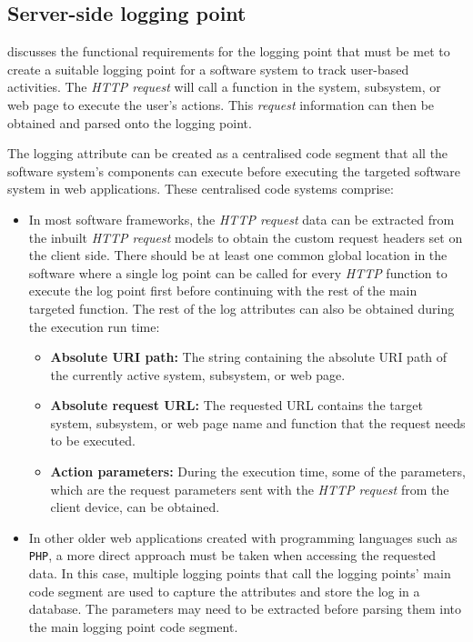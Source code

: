 \clearpage

\subsection{Server-side logging point}\label{sec:ch2_serverSideLoggingpoint}
 discusses the functional requirements for the logging point that must be met to create a suitable logging point for a software system to track user-based activities. The \textit{HTTP request} will call a function in the system, subsystem, or web page to execute the user's actions. This \textit{request} information can then be obtained and parsed onto the logging point. \par The logging attribute can be created as a centralised code segment that all the software system's components can execute before executing the targeted software system in web applications. These centralised code systems comprise:

\begin{itemize}
	\item In most software frameworks, the \textit{HTTP request} data can be extracted from the inbuilt \textit{HTTP request} models to obtain the custom request headers set on the client side. There should be at least one common global location in the software where a single log point can be called for every \textit{HTTP} function to execute the log point first before continuing with the rest of the main targeted function. The rest of the log attributes can also be obtained during the execution run time:
	\begin{itemize}
		\item \textbf{Absolute URI path:} The string containing the absolute URI path of the currently active system, subsystem, or web page. 
		\item \textbf{Absolute request URL:} The requested URL contains the target system, subsystem, or web page name and function that the request needs to be executed. 
		\item \textbf{Action parameters:} During the execution time, some of the parameters, which are the request parameters sent with the \textit{HTTP request} from the client device, can be obtained.
	\end{itemize}
	\item In other older web applications created with programming languages such as \texttt{PHP}, a more direct approach must be taken when accessing the requested data. In this case, multiple logging points that call the logging points' main code segment are used to capture the attributes and store the log in a database. The parameters may need to be extracted before parsing them into the main logging point code segment.
\end{itemize}

